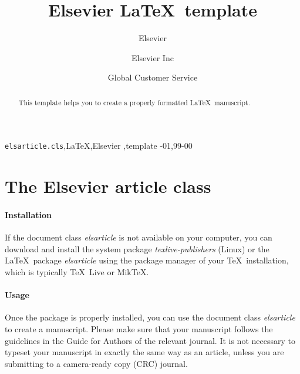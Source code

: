 \documentclass[review, twocolumn]{elsarticle}
\begin{document}
\begin{frontmatter}

\title{Elsevier \LaTeX\ template}

\author{Elsevier}
\address{Radarweg 29, Amsterdam}

\author[mymainaddress,mysecondaryaddress]{Elsevier Inc}

\author[mysecondaryaddress]{Global Customer Service}

\address[mymainaddress]{1600 John F Kennedy Boulevard, Philadelphia}
\address[mysecondaryaddress]{360 Park Avenue South, New York}

\begin{abstract}
This template helps you to create a properly formatted \LaTeX\ manuscript.
\end{abstract}

\begin{keyword}
\texttt{elsarticle.cls}\sep \LaTeX\sep Elsevier \sep template
-01\sep  99-00
\end{keyword}

\end{frontmatter}

\linenumbers

\section{The Elsevier article class}

\paragraph{Installation} If the document class \emph{elsarticle} is not available on your computer, you can download and install the system package \emph{texlive-publishers} (Linux) or the \LaTeX\ package \emph{elsarticle} using the package manager of your \TeX\ installation, which is typically \TeX\ Live or Mik\TeX.

\paragraph{Usage} Once the package is properly installed, you can use the document class \emph{elsarticle} to create a manuscript. Please make sure that your manuscript follows the guidelines in the Guide for Authors of the relevant journal. It is not necessary to typeset your manuscript in exactly the same way as an article, unless you are submitting to a camera-ready copy (CRC) journal.
\end{document}
